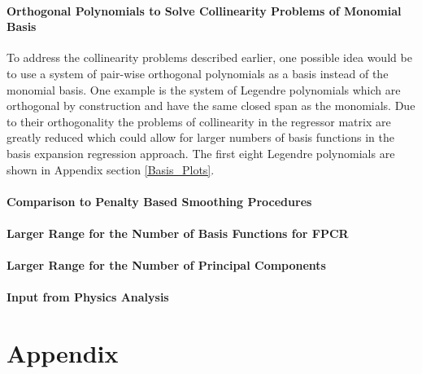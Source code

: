 \documentclass[11pt,twoside,a4paper]{article}
\begin{document}
	\paragraph{Orthogonal Polynomials to Solve Collinearity Problems of Monomial Basis}
	To address the collinearity problems described earlier, one possible idea would be to use a system of pair-wise orthogonal polynomials as a basis instead of the monomial basis. One example is the system of Legendre polynomials which are orthogonal by construction and have the same closed span as the monomials. Due to their orthogonality the problems of collinearity in the regressor matrix are greatly reduced which could allow for larger numbers of basis functions in the basis expansion regression approach. The first eight Legendre polynomials are shown in Appendix section \ref{Basis_Plots}.
	
	\paragraph{Comparison to Penalty Based Smoothing Procedures}
	
	\paragraph{Larger Range for the Number of Basis Functions for FPCR}
	
	\paragraph{Larger Range for the Number of Principal Components}
	
	\paragraph{Input from Physics Analysis}
	
	
	\nocite{James.2009} %
	
	\newpage
	\section{Appendix}
	
\end{document}
